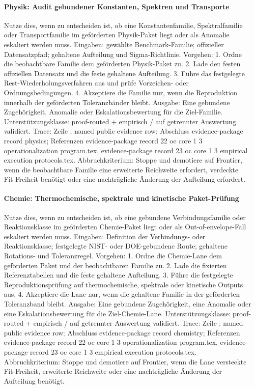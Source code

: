\paragraph{Physik: Audit gebundener Konstanten, Spektren und Transporte}
Nutze dies, wenn zu entscheiden ist, ob eine Konstantenfamilie, Spektralfamilie oder Transportfamilie im geförderten Physik-Paket liegt oder als Anomalie eskaliert werden muss.
Eingaben: gewählte Benchmark-Familie; \allowbreak offizieller Datensatzpfad; \allowbreak gehaltene Aufteilung und Sigma-Richtlinie.
Vorgehen: 1. Ordne die beobachtbare Familie dem geförderten Physik-Paket zu. 2. Lade den festen offiziellen Datensatz und die feste gehaltene Aufteilung. 3. Führe das festgelegte Rest-Wiederholungsverfahren aus und prüfe Vorzeichen- oder Ordnungsbedingungen. 4. Akzeptiere die Familie nur, wenn die Reproduktion innerhalb der geförderten Toleranzbänder bleibt.
Ausgabe: Eine gebundene Zugehörigkeit, Anomalie oder Eskalationsbewertung für die Ziel-Familie.
Unterstützungsklasse: proof-routed + empirisch / auf getrennter Auswertung validiert.
Trace: Zeile ; named public evidence row; \allowbreak Abschluss evidence-package record physics; \allowbreak Referenzen evidence-package record 22 oc core 1 3 operationalization program.tex, \allowbreak evidence-package record 23 oc core 1 3 empirical execution protocols.tex.
Abbruchkriterium: Stoppe und demotiere auf Frontier, wenn die beobachtbare Familie eine erweiterte Reichweite erfordert, verdeckte Fit-Freiheit benötigt oder eine nachträgliche Änderung der Aufteilung erfordert.

\paragraph{Chemie: Thermochemische, spektrale und kinetische Paket-Prüfung}
Nutze dies, wenn zu entscheiden ist, ob eine gebundene Verbindungsfamilie oder Reaktionsklasse im geförderten Chemie-Paket liegt oder als Out-of-envelope-Fall eskaliert werden muss.
Eingaben: Definition der Verbindungs- oder Reaktionsklasse; \allowbreak festgelegte NIST- oder DOE-gebundene Route; \allowbreak gehaltene Rotations- und Toleranzregel.
Vorgehen: 1. Ordne die Chemie-Lane dem geförderten Paket und der beobachtbaren Familie zu. 2. Lade die fixierten Referenztabellen und die feste gehaltene Aufteilung. 3. Führe die festgelegte Reproduktionsprüfung auf thermochemische, spektrale oder kinetische Outputs aus. 4. Akzeptiere die Lane nur, wenn die gehaltene Familie in der geförderten Toleranzband bleibt.
Ausgabe: Eine gebundene Zugehörigkeit, eine Anomalie oder eine Eskalationsbewertung für die Ziel-Chemie-Lane.
Unterstützungsklasse: proof-routed + empirisch / auf getrennter Auswertung validiert.
Trace: Zeile ; named public evidence row; \allowbreak Abschluss evidence-package record chemistry; \allowbreak Referenzen evidence-package record 22 oc core 1 3 operationalization program.tex, \allowbreak evidence-package record 23 oc core 1 3 empirical execution protocols.tex.
Abbruchkriterium: Stoppe und demotiere auf Frontier, wenn die Lane versteckte Fit-Freiheit, erweiterte Reichweite oder eine nachträgliche Änderung der Aufteilung benötigt.

